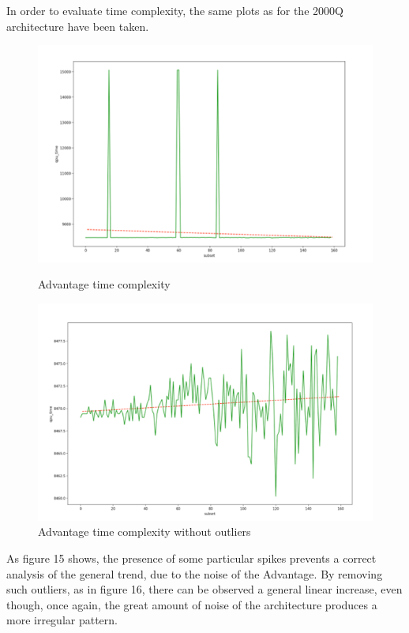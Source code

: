 \documentclass[oneside,a4paper]{article}
\begin{document}
In order to evaluate time complexity, the same plots as for the 2000Q architecture have been taken.

\begin{figure}[htp]
\centering
\begin{minipage}[b]{12.5cm}
\includegraphics[width=12.5cm]{LaTeXTemplate/Images/AdvantagefirstT2.png}
\caption{Advantage time complexity}
\end{minipage}
\begin{minipage}[b]{12cm}
\includegraphics[width=12cm]{LaTeXTemplate/Images/AdvantagefirstT1.png}
\caption{Advantage time complexity without outliers}
\end{minipage}
\end{figure}
As figure 15 shows, the presence of some particular spikes prevents a correct analysis of the general trend, due to the noise of the Advantage. By removing such outliers, as in figure 16, 
there can be observed a general linear increase, even though, once again, the great amount of noise of the architecture produces a more irregular pattern.
\newpage
\end{document}
